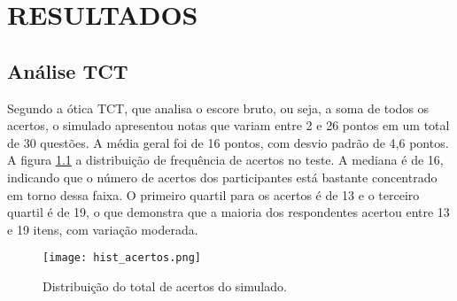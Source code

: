 \chapter{RESULTADOS}

\section{Análise TCT}

Segundo a ótica TCT, que analisa o escore bruto, ou seja, a soma de todos os acertos, o simulado apresentou notas que variam entre 2 e 26 pontos em um total de 30 questões. A média geral foi de 16 pontos, com desvio padrão de 4,6 pontos. A figura \ref{fig:hist_acertos} a distribuição de frequência de acertos no teste. A mediana é de 16, indicando que o número de acertos dos participantes está bastante concentrado em torno dessa faixa. O primeiro quartil para os acertos é de 13 e o terceiro quartil é de 19, o que demonstra que a maioria dos respondentes acertou entre 13 e 19 itens, com variação moderada.

\begin{figure}[H]
	\centering
	\texttt{[image: hist\_acertos.png]}
	\caption{Distribuição do total de acertos do simulado.}
	\label{fig:hist_acertos}
\end{figure}

